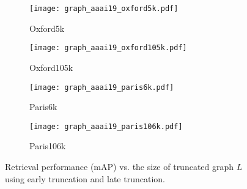 \documentclass[letterpaper]{article} \usepackage{aaai19}  \usepackage{times}  \usepackage{helvet}  \usepackage{courier}  \usepackage{url}  \usepackage{graphicx}  \frenchspacing  \setlength{\pdfpagewidth}{8.5in}  \setlength{\pdfpageheight}{11in}
\begin{document}
\begin{figure*}[t!]
\centering
\begin{subfigure}[b]{0.24\linewidth}
  \texttt{[image: graph\_aaai19\_oxford5k.pdf]}
  \caption{Oxford5k}
\end{subfigure}
\begin{subfigure}[b]{0.24\linewidth}
  \texttt{[image: graph\_aaai19\_oxford105k.pdf]}
  \caption{Oxford105k}
\end{subfigure}
\begin{subfigure}[b]{0.24\linewidth}
  \texttt{[image: graph\_aaai19\_paris6k.pdf]}
  \caption{Paris6k}
\end{subfigure}
\begin{subfigure}[b]{0.24\linewidth}
  \texttt{[image: graph\_aaai19\_paris106k.pdf]}
  \caption{Paris106k}
\end{subfigure}
\caption{Retrieval performance (mAP) vs. the size of truncated graph $L$ using early truncation and late truncation.}
\label{fig:subgraph_norm}
\vspace{-2mm}
\end{figure*}
\end{document}
